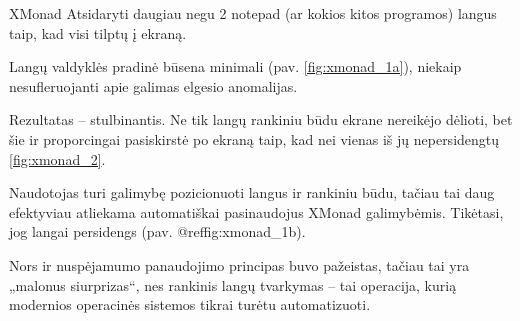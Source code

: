 \begin{xcase}{XMonad}
  \xcgoal
  {
    Atsidaryti daugiau negu 2 notepad (ar kokios kitos programos) langus taip, kad visi 
    tilptų į ekraną.
  }
  
  \xctools
  {
    Langų valdyklės pradinė būsena minimali (pav. \ref{fig:xmonad_1a}), niekaip nesufleruojanti apie galimas elgesio
    anomalijas.
    {
    }
  }
  
  \xcresult
  {
    Rezultatas – stulbinantis. Ne tik langų rankiniu būdu ekrane nereikėjo dėlioti, bet šie
    ir proporcingai pasiskirstė po ekraną taip, kad nei vienas iš jų nepersidengtų \ref{fig:xmonad_2}.
  }
  
  \xcprinciples
  {
    {
      Naudotojas turi galimybę pozicionuoti langus ir rankiniu būdu, tačiau tai daug efektyviau
      atliekama automatiškai pasinaudojus XMonad galimybėmis.
    }
    {
      Tikėtasi, jog langai persidengs (pav. @ref{fig:xmonad_1b}).
    }
  }
  
  \xcthoughts
  {
    Nors ir nuspėjamumo panaudojimo principas buvo pažeistas, tačiau tai yra „malonus 
    siurprizas“, nes rankinis langų tvarkymas – tai operacija, kurią modernios operacinės
    sistemos tikrai turėtu automatizuoti.
  }
\end{xcase}
